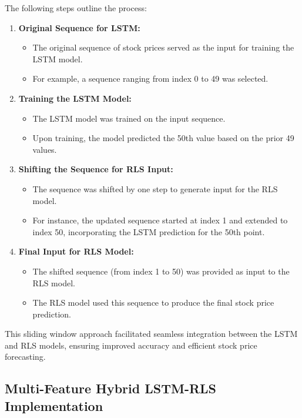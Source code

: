 The following steps outline the process:

\begin{enumerate}
    \item \textbf{Original Sequence for LSTM:}
    \begin{itemize}
        \item The original sequence of stock prices served as the input for training the LSTM model.
        \item For example, a sequence ranging from index 0 to 49 was selected.
    \end{itemize}
    
    \item \textbf{Training the LSTM Model:}
    \begin{itemize}
        \item The LSTM model was trained on the input sequence.
        \item Upon training, the model predicted the 50th value based on the prior 49 values.
    \end{itemize}
    
    \item \textbf{Shifting the Sequence for RLS Input:}
    \begin{itemize}
        \item The sequence was shifted by one step to generate input for the RLS model.
        \item For instance, the updated sequence started at index 1 and extended to index 50, incorporating the LSTM prediction for the 50th point.
    \end{itemize}
    
    \item \textbf{Final Input for RLS Model:}
    \begin{itemize}
        \item The shifted sequence (from index 1 to 50) was provided as input to the RLS model.
        \item The RLS model used this sequence to produce the final stock price prediction.
    \end{itemize}
\end{enumerate}

This sliding window approach facilitated seamless integration between the LSTM and RLS models, ensuring improved accuracy and efficient stock price forecasting.

\subsection{Multi-Feature Hybrid LSTM-RLS Implementation}


